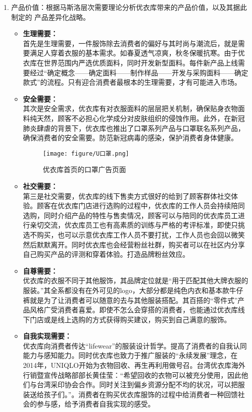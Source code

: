 \documentclass{xjtureport}
\begin{document}
\begin{enumerate}
\begin{enumerate}
    \item 产品价值：根据马斯洛层次需要理论分析优衣库带来的产品价值，以及其据此制定的
产品差异化战略。
    \begin{itemize}
        \item \textbf{生理需要：}\\
        首先是生理需要，一件服饰除去消费者的偏好与其时尚与潮流后，就是需要满足人穿着衣服的基本需求。如春夏透气凉爽，秋冬保暖抗寒。由于优衣库在世界范围内严选优质面料，同时开发新型面料。每件新产品上线需要经过“确定概念——确定面料——制作样品——开发与采购面料——确定款式”的流程。\cite{ref6}只有迎合消费者最根本的生理需要，才有可能进入市场。
        \item \textbf{安全需要：}\\
        其次是安全需求，优衣库有对衣服面料的层层把关机制，确保贴身衣物面料纯天然，顾客不必担心化学成分对皮肤组织的侵蚀作用。此外，在新冠肺炎肆虐的背景下，优衣库也推出了口罩系列产品与口罩联名系列产品，确保消费者的安全需要。防范新冠病毒的感染，保护消费者身体健康。
        \begin{figure}[H]
            \centering
            \texttt{[image: figure/U口罩.png]}
            \caption{优衣库首页的口罩广告页面}
        \end{figure}
        \item \textbf{社交需要：}\\
        第三是社交需要，优衣库的线下售卖方式很好的给到了顾客群体社交体验。顾客在优衣库门店进行选购的过程中，优衣库的工作人员会持续陪同选购，同时介绍产品的特性与售卖情况，顾客可以与陪同的优衣库员工进行亲切交流，优衣库员工也有高素质的训练与严格的考评标准，即使只挑选不购买，也可以示意优衣库工作人员不要打扰，工作人员也会回以微笑然后默默离开。同时优衣库也会经营粉丝社群，购买者可以在社区内分享自己购买产品的评测和穿着体验。打造品牌粉丝效应。
        \item \textbf{自尊需要：}\\
        优衣库的衣服不同于其他服饰，其品牌定位就是“用于匹配其他大牌衣服的服装。”其全系都没有在外可见的logo，大部分都是纯色内衣和基本款牛仔裤就是为了让消费者可以随意的去与其他服装搭配。其百搭的“零件式”产品风格广受消费者喜爱。即使不怎么会穿搭的消费者，也能通过优衣库线下门店或是线上选购的方式获得购买建议，购买到自己满意的服饰。
        \item \textbf{自我实现需要：}\\
        优衣库向消费者传达“lifewear”的服装设计哲学。提高了消费者的自我认同能力与感知能力。同时优衣库也致力于推广服装的“永续发展”理念，在2014年，UNIQLO开始为衣物回收、再生再利用做号召。台湾优衣库海外行销暨宣传战略部部长黄佳莹：“希望回收的衣物可以被充分使用，因此他们与台湾采印协会合作。同时关注到偏乡资源分配不均的状况，可以把服装送给孩子们。”\cite{ref9}。消费者在购买优衣库服饰的过程中给消费者一种回馈社会的参与感，给予消费者自我实现的感受。

\end{itemize}
\end{enumerate}
\end{enumerate}
\end{document}
